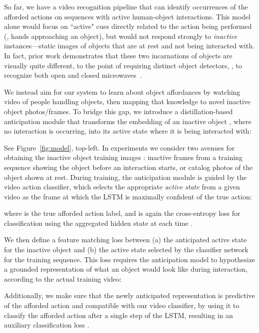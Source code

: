 \documentclass[10pt,twocolumn,letterpaper]{article}
\newcommand{\reffig}[1]{Figure~\ref{#1}}
\begin{document}
So far, we have a video recognition pipeline that can identify occurrences of the afforded actions on sequences with active human-object interactions.
This model alone would focus on ``active" cues directly related to the action being performed (\eg, hands approaching an object), but would not respond strongly to \emph{inactive} instances---static images of objects that are at rest and not being interacted with. 
In fact, prior work demonstrates that these two incarnations of objects are visually quite different, to the point of requiring distinct object detectors, \eg, to recognize both open and closed microwaves~\cite{deva-adl-2012}.

We instead aim for our system to learn about object affordances by watching video of people handling objects, then mapping that knowledge to novel inactive object photos/frames. 
To bridge this gap, we introduce a distillation-based anticipation module  that transforms the embedding of an inactive object , where no interaction is occurring, into its active state where it is being interacted with:
 
See \reffig{fig:model}, top-left.
In experiments we consider two avenues for obtaining the inactive object training images : inactive frames from a training sequence showing the object before an interaction starts, or catalog photos of the object shown at rest.
During training, the anticipation module is guided by the video action classifier, which selects the appropriate \emph{active state} from a given video as the frame  at which the LSTM is maximally confident of the true action: 

where  is the true afforded action label, and  is again the cross-entropy loss for classification using the aggregated hidden state at each time .

We then define a feature matching loss between (a) the anticipated active state for the inactive object and (b) the active state selected by the classifier network for the training sequence. This loss requires the anticipation model to hypothesize a grounded representation of what an object would look like during interaction, according to the actual training video:



Additionally, we make sure that the newly anticipated representation  is predictive of the afforded action and compatible with our video classifier, by using it to classify the afforded action after a single step of the LSTM, resulting in an auxiliary classification loss .
\end{document}
